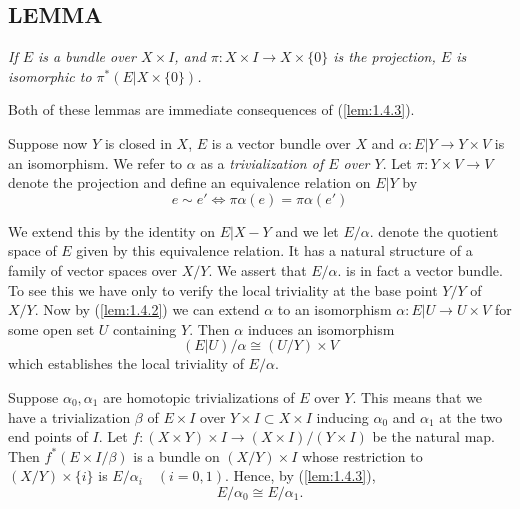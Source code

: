 \subsection{LEMMA}\label{lem:1.4.5} \textit{If $E$ is a bundle over $X \times I$, and $\pi: X \times I \to X \times \{0\}$ is the projection, $E$ is isomorphic to $\pi^*(E \vert X \times \{0\})$.} \par 

Both of these lemmas are immediate consequences of (\ref{lem:1.4.3}). \par \hfill

Suppose now $Y$ is closed in $X$, $E$ is a vector bundle over $X$ and $\alpha: E \vert Y \to Y \times V$ is an isomorphism. We refer to $\alpha$ as a \textit{trivialization of $E$ over $Y$}. Let $\pi: Y \times V \to V$ denote the projection and define an equivalence relation on $E \vert Y$ by
\begin{equation*}
    e \sim e' \iff \pi \alpha (e) = \pi \alpha (e')
\end{equation*}

We extend this by the identity on $E \vert X - Y$ and we let $E/\alpha$. denote the quotient space of $E$ given by this equivalence relation. It has a natural structure of a family of vector spaces over $X/Y$. We assert that $E/\alpha$. is in fact a vector bundle. To see this we have only to verify the local triviality at the base point $Y/Y$ of $X/Y$. Now by (\ref{lem:1.4.2}) we can extend $\alpha$ to an isomorphism $\alpha: E \vert U \to U \times V$ for some open set $U$ containing $Y$. Then $\alpha$ induces an isomorphism
\begin{equation*}
    (E \vert U) / \alpha \cong (U/Y) \times V
\end{equation*}
which establishes the local triviality of $E/\alpha$. \par

Suppose $\alpha_0, \alpha_1$ are homotopic trivializations of $E$ over $Y$. This means that we have a trivialization $\beta$ of $E \times I$ over $Y \times I \subset X \times I$ inducing $\alpha_0$ and $\alpha_1$ at the two end points of $I$. Let $f: (X \times Y) \times I \to (X \times I)/(Y \times I)$ be the natural map. Then $f^*(E \times I/\beta)$ is a bundle on $(X/Y) \times I$ whose restriction to $(X/Y) \times \{i\}$ is $E/\alpha_i \quad (i = 0, 1)$. Hence, by (\ref{lem:1.4.3}),
\begin{equation*}
    E/\alpha_0 \cong  E/\alpha_1.
\end{equation*}

